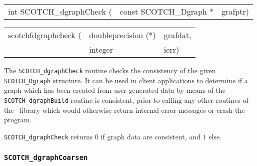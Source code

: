 \begin{itemize}
\progsyn

{\tt\begin{tabular}{l@{}ll}
int SCOTCH\_dgraphCheck ( & const SCOTCH\_Dgraph * & grafptr)
\end{tabular}}

{\tt\begin{tabular}{l@{}ll}
scotchfdgraphcheck ( & doubleprecision (*) & grafdat, \\
                     & integer             & ierr)
\end{tabular}}

\progdes

The {\tt SCOTCH\_dgraphCheck} routine checks the consistency of the
given {\tt SCOTCH\_\lbt Dgraph} structure. It can be used in client
applications to determine if a graph which has been created from
user-generated data by means of the {\tt SCOTCH\_\lbt dgraph\lbt Build}
routine is consistent, prior to calling any other routines of the
\libscotch\ library which would otherwise return internal error
messages or crash the program.

\progret

{\tt SCOTCH\_dgraphCheck} returns $0$ if graph data are consistent, and
$1$ else.

\end{itemize}

\subsubsection{{\tt SCOTCH\_dgraphCoarsen}}

